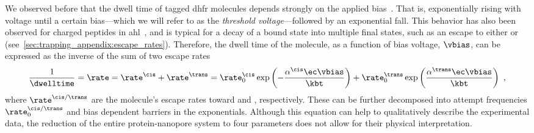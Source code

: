 We observed before that the dwell time of tagged \gls{dhfr} molecules depends strongly on the applied
bias~\cite{Biesemans-2015}. That is, exponentially rising with voltage until a certain bias---which we will
refer to as the \emph{threshold voltage}---followed by an exponential fall. This behavior has also been
observed for charged peptides in \gls{ahl}~\cite{Movileanu-2005}, and is typical for a decay of a bound state
into multiple final states, such as an escape to either \cisi{} or \transi{}
(see~\cref{sec:trapping_appendix:escape_rates}). Therefore, the dwell time of the molecule, as a function of
bias voltage, $\vbias$, can be expressed as the inverse of the sum of two escape rates~\cite{Movileanu-2005}
%
\begin{align}\label{eq:double_barrier_simple}
	\dfrac{1}{\dwelltime} = \rate = \rate^\cis + \rate^\trans	=
    \rate^\cis_0 \exp \left( -\dfrac{\alpha^\cis \ec \vbias}{\kbt} \right) +
    \rate^\trans_0 \exp \left( \dfrac{\alpha^\trans \ec \vbias}{\kbt} \right)
  \text{ ,}
\end{align}
%
where $\rate^{\cis/\trans}$ are the molecule's escape rates toward \cisi{} and \transi{}, respectively. These
can be further decomposed into attempt frequencies $\rate^{\cis/\trans}_0$ and bias dependent barriers in the
exponentials. Although this equation can help to qualitatively describe the experimental data, the reduction
of the entire protein-nanopore system to four parameters does not allow for their physical interpretation.

